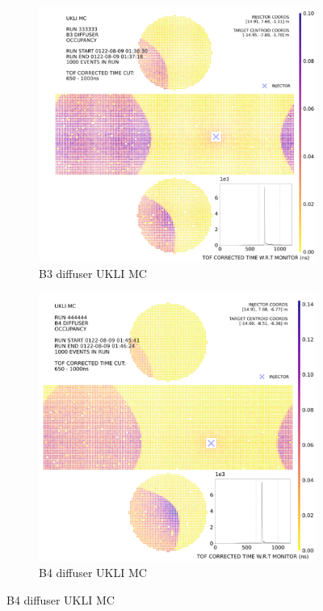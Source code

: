 \begin{figure}[htp]
 
        
        \begin{subfigure}{0.49\columnwidth}
        \centering
        \includegraphics[width=\textwidth]{Figures/ukli_diff_mc_B3.PNG}
        \caption{B3 diffuser UKLI MC}
        \label{fig:time3}
        \end{subfigure}\hfill
        \begin{subfigure}{0.49\columnwidth}
        \centering
        \includegraphics[width=\textwidth]{Figures/ukli_diff_mc_B4.PNG}
        \caption{B4 diffuser UKLI MC}
        \label{fig:time4}
        \end{subfigure}
        

\end{figure}
